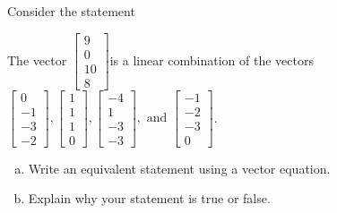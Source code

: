 
\begin{exerciseStatement}


Consider the statement 
\begin{center}\begin{minipage}{0.8\textwidth}
 The vector \( \left[\begin{array}{c}
9 \\
0 \\
10 \\
8
\end{array}\right] \)is a linear combination of the vectors \( \left[\begin{array}{c}
0 \\
-1 \\
-3 \\
-2
\end{array}\right] , \left[\begin{array}{c}
1 \\
1 \\
1 \\
0
\end{array}\right] , \left[\begin{array}{c}
-4 \\
1 \\
-3 \\
-3
\end{array}\right] , \text{ and } \left[\begin{array}{c}
-1 \\
-2 \\
-3 \\
0
\end{array}\right] \). 
\end{minipage}\end{center}
    


\begin{enumerate}[(a)]
\item  Write an equivalent statement using a vector equation.
\item  Explain why your statement is true or false.
\end{enumerate}
    
\end{exerciseStatement}
    
